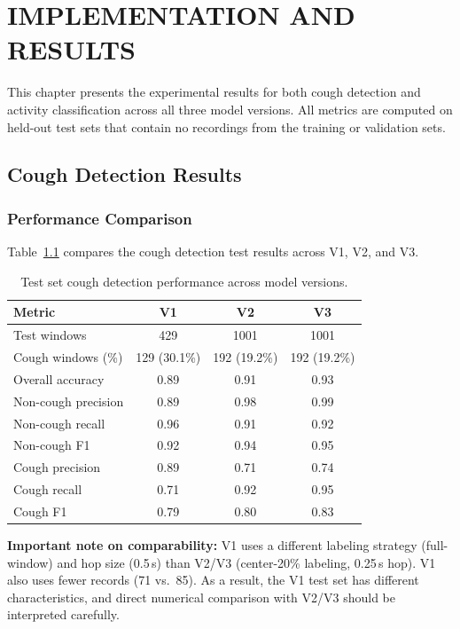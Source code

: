 \chapter{IMPLEMENTATION AND RESULTS}

This chapter presents the experimental results for both cough detection and activity classification across all three model versions. All metrics are computed on held-out test sets that contain no recordings from the training or validation sets.

\section{Cough Detection Results}

\subsection{Performance Comparison}

Table~\ref{tab:cough_results} compares the cough detection test results across V1, V2, and V3.

\begin{table}[H]
\centering
\caption{Test set cough detection performance across model versions.}
\label{tab:cough_results}
\begin{tabular}{@{}lccc@{}}
\toprule
\textbf{Metric} & \textbf{V1} & \textbf{V2} & \textbf{V3} \\
\midrule
Test windows & 429 & 1001 & 1001 \\
Cough windows (\%) & 129 (30.1\%) & 192 (19.2\%) & 192 (19.2\%) \\
\midrule
Overall accuracy & 0.89 & 0.91 & 0.93 \\
\midrule
Non-cough precision & 0.89 & 0.98 & 0.99 \\
Non-cough recall & 0.96 & 0.91 & 0.92 \\
Non-cough F1 & 0.92 & 0.94 & 0.95 \\
\midrule
Cough precision & 0.89 & 0.71 & 0.74 \\
Cough recall & 0.71 & 0.92 & 0.95 \\
Cough F1 & 0.79 & 0.80 & 0.83 \\
\bottomrule
\end{tabular}
\end{table}

\textbf{Important note on comparability:} V1 uses a different labeling strategy (full-window) and hop size (0.5\,s) than V2/V3 (center-20\% labeling, 0.25\,s hop). V1 also uses fewer records (71 vs.\ 85). As a result, the V1 test set has different characteristics, and direct numerical comparison with V2/V3 should be interpreted carefully.

